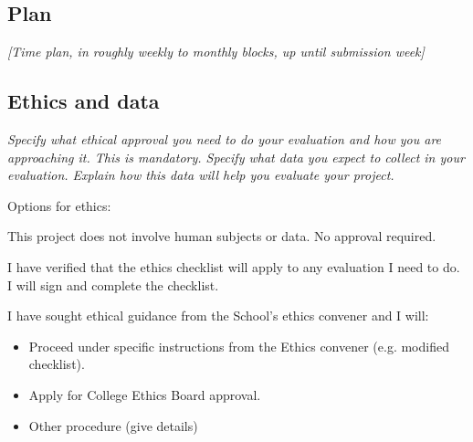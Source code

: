 \documentclass[11pt]{article}
\begin{document}
\subsection{Plan}\label{plan}

\emph{{[}Time plan, in roughly weekly to monthly blocks, up until
submission week{]}}

    
\subsection{Ethics and data}\label{ethics}
\emph{Specify what ethical approval you need to do your evaluation and how you are approaching it. This is mandatory. 
Specify what data you expect to collect in your evaluation. Explain how this data will help you evaluate your project.
}

Options for ethics:
\item This project does not involve human subjects or data. No approval required.
\item I have verified that the ethics checklist will apply to any evaluation I need to do. I will sign and complete the checklist.
\item I have sought ethical guidance from the School's ethics convener and I will:
\begin{itemize}
    \item Proceed under specific instructions from the Ethics convener (e.g. modified checklist).
    \item Apply for College Ethics Board approval.
    \item Other procedure (give details)
\end{itemize}    
\end{document}
